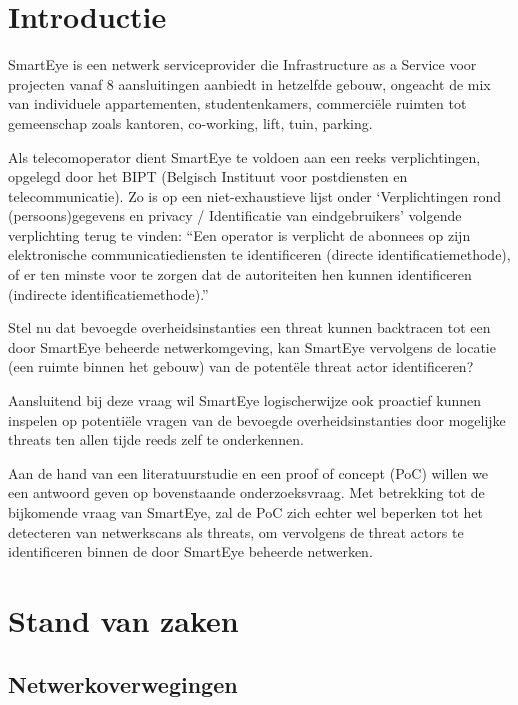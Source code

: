 
\section{Introductie}%
\label{sec:introductie}
SmartEye is een netwerk serviceprovider die Infrastructure as a Service voor projecten vanaf 8 aansluitingen aanbiedt in hetzelfde gebouw, ongeacht de mix van individuele appartementen, studentenkamers, commerciële ruimten tot gemeenschap zoals kantoren, co-working, lift, tuin, parking.~\autocite{Smarteye2021}

Als telecomoperator dient SmartEye te voldoen aan een reeks verplichtingen, opgelegd door het BIPT (Belgisch Instituut voor postdiensten en telecommunicatie). Zo is op een niet-exhaustieve lijst onder ‘Verplichtingen rond (persoons)\-gegevens en privacy / Identificatie van eindgebruikers’ volgende verplichting terug te vinden: “Een operator is verplicht de abonnees op zijn elektronische communicatiediensten te identificeren (directe identificatiemethode), of er ten minste voor te zorgen dat de autoriteiten hen kunnen identificeren (indirecte identificatiemethode).”~\autocite{BIPT2023}

Stel nu dat bevoegde overheidsinstanties een threat kunnen backtracen tot een door SmartEye beheerde netwerkomgeving, kan SmartEye vervolgens de locatie (een ruimte binnen het gebouw) van de potentële threat actor identificeren?

Aansluitend bij deze vraag wil SmartEye logischerwijze ook proactief kunnen inspelen op potentiële vragen van de bevoegde overheidsinstanties door mogelijke threats ten allen tijde reeds zelf te onderkennen.

Aan de hand van een literatuurstudie en een proof of concept (PoC) willen we een antwoord geven op bovenstaande onderzoeksvraag. Met betrekking tot de bijkomende vraag van Smart\-Eye, zal de PoC zich echter wel beperken tot het detecteren van netwerkscans als threats, om vervolgens de threat actors te identificeren binnen de door SmartEye beheerde netwerken.

\section{Stand van zaken}%
\label{sec:state-of-the-art}

\subsection{Netwerkoverwegingen}

